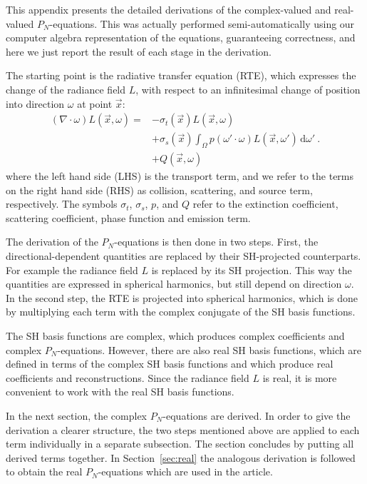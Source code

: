 \documentclass{egpubl}
\newcommand{\ud}{\,\mathrm{d}} %
\begin{document}
This appendix presents the detailed derivations of the complex-valued and real-valued $P_N$-equations. This was actually performed semi-automatically using our computer algebra representation of the equations, guaranteeing correctness, and here we just report the result of each stage in the derivation.

The starting point is the radiative transfer equation (RTE), which expresses the change of the radiance field $L$, with respect to an infinitesimal change of position into direction $\omega$ at point $\vec{x}$:
\begin{align}
\left(\nabla\cdot\omega\right)L\left(\vec{x}, \omega \right)
=&
-\sigma_t\left(\vec{x}\right) L\left(\vec{x}, \omega \right)\nonumber\\
&
+\sigma_s\left(\vec{x}\right) \int_{\Omega}
{
p\left(\omega'\cdot\omega\right)L\left(\vec{x}, \omega' \right)\ud\omega'
} \ . \nonumber\\
&
+Q\left(\vec{x}, \omega\right)\nonumber
\end{align}
where the left hand side (LHS) is the transport term, and we refer to the terms on the right hand side (RHS) as collision, scattering, and source term, respectively. The symbols $\sigma_t$, $\sigma_s$, $p$, and $Q$ refer to the extinction coefficient, scattering coefficient, phase function and emission term.

The derivation of the $P_N$-equations is then done in two steps. First, the directional-dependent quantities are replaced by their SH-projected counterparts. For example the radiance field $L$ is replaced by its SH projection. This way the quantities are expressed in spherical harmonics, but still depend on direction $\omega$. In the second step, the RTE is projected into spherical harmonics, which is done by multiplying each term with the complex conjugate of the SH basis functions.

The SH basis functions are complex, which produces complex coefficients and complex $P_N$-equations. However, there are also real SH basis functions, which are defined in terms of the complex SH basis functions and which produce real coefficients and reconstructions. Since the radiance field $L$ is real, it is more convenient to work with the real SH basis functions.

In the next section, the complex $P_N$-equations are derived. In order to give the derivation a clearer structure, the two steps mentioned above are applied to each term individually in a separate subsection. The section concludes by putting all derived terms together. In Section~\ref{sec:real} the analogous derivation is followed to obtain the real $P_N$-equations which are used in the article.
\end{document}
